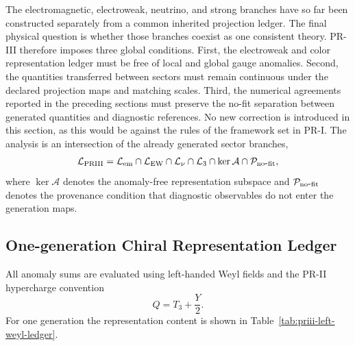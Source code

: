 \documentclass[11pt]{article}
\begin{document}
The electromagnetic, electroweak, neutrino, and strong branches have so far been constructed separately from a common inherited projection ledger.  The final physical question is whether those branches coexist as one consistent theory.  PR-III therefore imposes three global conditions.  First, the electroweak and color representation ledger must be free of local and global gauge anomalies.  Second, the quantities transferred between sectors must remain continuous under the declared projection maps and matching scales.  Third, the numerical agreements reported in the preceding sections must preserve the no-fit separation between generated quantities and diagnostic references. No new correction is introduced in this section, as this would be against the rules of the framework set in PR-I.  The analysis is an intersection of the already generated sector branches,
\begin{equation}
\mathcal L_{\rm PRIII}
=
\mathcal L_{\rm em}
\cap
\mathcal L_{\rm EW}
\cap
\mathcal L_{\nu}
\cap
\mathcal L_{3}
\cap
\ker\mathcal A
\cap
\mathcal P_{\rm no\mbox{-}fit},
\label{eq:priii-global-intersection}
\end{equation}
where \(\ker\mathcal A\) denotes the anomaly-free representation subspace and \(\mathcal P_{\rm no\mbox{-}fit}\) denotes the provenance condition that diagnostic observables do not enter the generation maps.

\subsection{One-generation Chiral Representation Ledger}
\label{subsec:priii-one-generation-representation-ledger}

All anomaly sums are evaluated using left-handed Weyl fields and the PR-II hypercharge convention \cite{PDG2024}
\begin{equation}
Q=T_3+\frac{Y}{2}.
\label{eq:priii-global-charge-convention}
\end{equation}
For one generation the representation content is shown in Table~\ref{tab:priii-left-weyl-ledger}.
\end{document}

